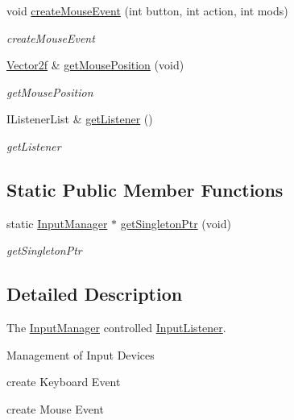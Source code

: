 \begin{DoxyCompactItemize}
\item 
void \hyperlink{classEngine_1_1InputManager_a62aab81c0b4c43dad82ad84feb32487c}{create\+Mouse\+Event} (int button, int action, int mods)
\begin{DoxyCompactList}\small\item\em create\+Mouse\+Event \end{DoxyCompactList}\item 
\hyperlink{classVector2}{Vector2f} \& \hyperlink{classEngine_1_1InputManager_a398d43ff9c84e95767523ca74de12ed9}{get\+Mouse\+Position} (void)
\begin{DoxyCompactList}\small\item\em get\+Mouse\+Position \end{DoxyCompactList}\item 
I\+Listener\+List \& \hyperlink{classEngine_1_1InputManager_a34f49a2a02ab0f7d44ee404978836711}{get\+Listener} ()
\begin{DoxyCompactList}\small\item\em get\+Listener \end{DoxyCompactList}\end{DoxyCompactItemize}
\subsection*{Static Public Member Functions}
\begin{DoxyCompactItemize}
\item 
static \hyperlink{classEngine_1_1InputManager}{Input\+Manager} $\ast$ \hyperlink{classEngine_1_1InputManager_a2cdade9d1d20018f8ad556b5a571beda}{get\+Singleton\+Ptr} (void)
\begin{DoxyCompactList}\small\item\em get\+Singleton\+Ptr \end{DoxyCompactList}\end{DoxyCompactItemize}


\subsection{Detailed Description}
The \hyperlink{classEngine_1_1InputManager}{Input\+Manager} controlled \hyperlink{classEngine_1_1InputListener}{Input\+Listener}. 

Management of Input Devices


\begin{DoxyItemize}
\item create Keyboard Event
\item create Mouse Event 
\end{DoxyItemize}


